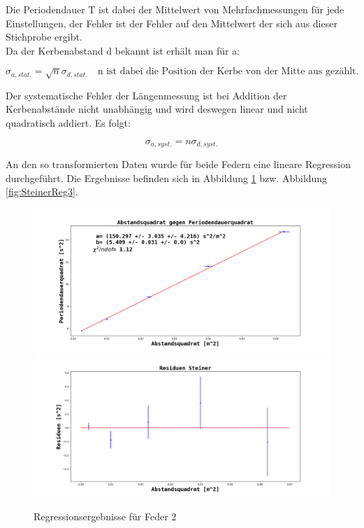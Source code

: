 \documentclass[12pt,a4paper]{article}
\begin{document}
Die Periodendauer T ist dabei der Mittelwert von Mehrfachmessungen für jede Einstellungen, der Fehler ist der Fehler auf den Mittelwert der sich aus dieser Stichprobe ergibt.\\
Da der Kerbenabstand d bekannt ist erhält man für a:

\begin{equation}
\sigma_{a,stat.}=\sqrt{n} \sigma_{d,stat.} \quad \text{n ist dabei die Position der Kerbe von der Mitte aus gezählt.}
\end{equation}

Der systematische Fehler der Längenmessung ist bei Addition der Kerbenabstände nicht unabhängig und wird deswegen linear und nicht quadratisch addiert. Es folgt:

\begin{equation}
\sigma_{a,syst.}=n \sigma_{d,syst.}
\end{equation}

An den so transformierten Daten wurde für beide Federn eine lineare Regression durchgeführt. Die Ergebnisse befinden sich in Abbildung \ref{fig:SteinerReg2} bzw. Abbildung \ref{fig:SteinerReg3}.

\begin{figure}
\begin{center}
\includegraphics[scale=0.3]{Bilder/Steiner_Feder2_linReg}
\includegraphics[scale=0.3]{Bilder/Steiner_Feder2_Residuen}
\end{center}
\caption{Regressionsergebnisse für Feder 2}
\label{fig:SteinerReg2}
\end{figure}
\end{document}
